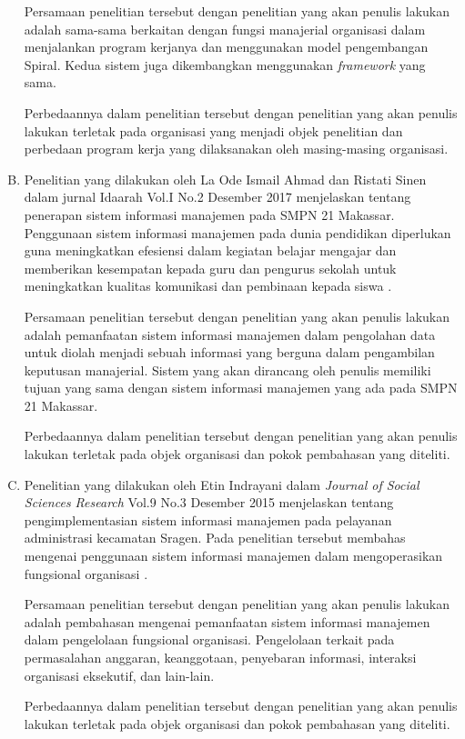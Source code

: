 \begin{enumerate}[A.]
	Persamaan penelitian tersebut dengan penelitian yang akan penulis lakukan adalah sama-sama berkaitan dengan fungsi manajerial organisasi dalam menjalankan program kerjanya dan menggunakan model pengembangan Spiral. Kedua sistem juga dikembangkan menggunakan \textit{framework} yang sama.
	
	Perbedaannya dalam penelitian tersebut dengan penelitian yang akan penulis lakukan terletak pada organisasi yang menjadi objek penelitian dan perbedaan program kerja yang dilaksanakan oleh masing-masing organisasi.
	
	\item Penelitian yang dilakukan oleh La Ode Ismail Ahmad dan Ristati Sinen dalam jurnal Idaarah Vol.I No.2 Desember 2017 menjelaskan tentang penerapan sistem informasi manajemen pada SMPN 21 Makassar. Penggunaan sistem informasi manajemen pada dunia pendidikan diperlukan guna meningkatkan efesiensi dalam kegiatan belajar mengajar dan memberikan kesempatan kepada guru dan pengurus sekolah untuk meningkatkan kualitas komunikasi dan pembinaan kepada siswa \cite{ahmad}.
	
	Persamaan penelitian tersebut dengan penelitian yang akan penulis lakukan adalah pemanfaatan sistem informasi manajemen dalam pengolahan data untuk diolah menjadi sebuah informasi yang berguna dalam pengambilan keputusan manajerial. Sistem yang akan dirancang oleh penulis memiliki tujuan yang sama dengan sistem informasi manajemen yang ada pada SMPN 21 Makassar. 
 
 	Perbedaannya dalam penelitian tersebut dengan penelitian yang akan penulis lakukan terletak pada objek organisasi dan pokok pembahasan yang diteliti.
 	
 	\item Penelitian yang dilakukan oleh Etin Indrayani dalam \textit{Journal of Social Sciences Research} Vol.9 No.3 Desember 2015 menjelaskan tentang pengimplementasian sistem informasi manajemen pada pelayanan administrasi kecamatan Sragen. Pada penelitian tersebut membahas mengenai penggunaan sistem informasi manajemen dalam mengoperasikan fungsional organisasi \cite{indrayani}.
 	
 	Persamaan penelitian tersebut dengan penelitian yang akan penulis lakukan adalah pembahasan mengenai pemanfaatan sistem informasi manajemen dalam pengelolaan fungsional organisasi. Pengelolaan terkait pada permasalahan anggaran, keanggotaan, penyebaran informasi, interaksi organisasi eksekutif, dan lain-lain.
 	
 	Perbedaannya dalam penelitian tersebut dengan penelitian yang akan penulis lakukan terletak pada objek organisasi dan pokok pembahasan yang diteliti.
	
	
\end{enumerate}

		

